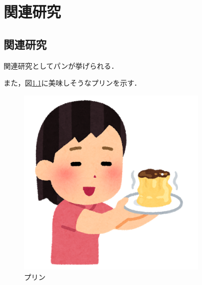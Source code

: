 \chapter{関連研究}
\thispagestyle{fancy}

\section{関連研究}
関連研究としてパンが挙げられる\cite{pan}．

また，図\ref{purin}に美味しそうなプリンを示す．
\begin{figure}[t]
  \centering
  \includegraphics[width=9cm]{image/purin.png}
  \caption{プリン}
\label{purin}
\end{figure}

